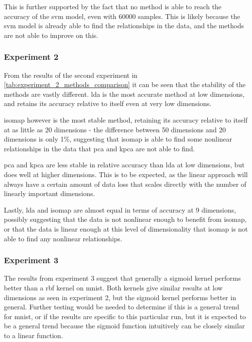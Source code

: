 This is further supported by the fact that no method is able to reach the accuracy of the \gls{svm} model, even with 60000 samples. This is likely because the \gls{svm} model is already able to find the relationships in the data, and the methods are not able to improve on this.


\subsubsection{Experiment 2}\label{subsec:experiment-2}
From the results of the second experiment in \autoref{tab:experiment_2_methods_comparison} it can be seen that the stability of the methods are vastly different. \gls{lda} is the most accurate method at low dimensions, and retains its accuracy relative to itself even at very low dimensions.

\gls{isomap} however is the most stable method, retaining its accuracy relative to itself at as little as 20 dimensions - the difference between 50 dimensions and 20 dimensions is only 1\%, suggesting that \gls{isomap} is able to find some nonlinear relationships in the data that \gls{pca} and \gls{kpca} are not able to find.

\gls{pca} and \gls{kpca} are less stable in relative accuracy than \gls{lda} at low dimensions, but does well at higher dimensions. This is to be expected, as the linear approach will always have a certain amount of data loss that scales directly with the number of linearly important dimensions.

Lastly, \gls{lda} and \gls{isomap} are almost equal in terms of accuracy at 9 dimensions, possibly suggesting that the data is not nonlinear enough to benefit from \gls{isomap}, or that the data is linear enough at this level of dimensionality that \gls{isomap} is not able to find any nonlinear relationships.


\subsubsection{Experiment 3}\label{subsec:experiment-3}
The results from experiment 3 suggest that generally a sigmoid kernel performs better than a \gls{rbf} kernel on \gls{mnist}. Both kernels give similar results at low dimensions as seen in experiment 2, but the sigmoid kernel performs better in general. Further testing would be needed to determine if this is a general trend for \gls{mnist}, or if the results are specific to this particular run, but it is expected to be a general trend because the sigmoid function intuitively can be closely similar to a linear function.


